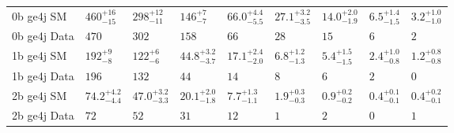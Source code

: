\begin{center}
\begin{table}[h!]
\begin{tabular}{ lllllllll }
\hline
0b ge4j SM \T   & $460^{+16}_{-15}$              & $298^{+12}_{-11}$              & $146^{+7}_{-7}$                & $66.0^{+4.4}_{-5.5}$           & $27.1^{+3.2}_{-3.5}$           & $14.0^{+2.0}_{-1.9}$           & $6.5^{+1.4}_{-1.5}$            & $3.2^{+1.0}_{-1.0}$            \\ 
0b ge4j Data \T & $470$                          & $302$                          & $158$                          & $66$                           & $28$                           & $15$                           & $6$                            & $2$                            \\ 
\hline
1b ge4j SM \T   & $192^{+9}_{-8}$                & $122^{+6}_{-6}$                & $44.8^{+3.2}_{-3.7}$           & $17.1^{+2.4}_{-2.0}$           & $6.8^{+1.2}_{-1.3}$            & $5.4^{+1.5}_{-1.5}$            & $2.4^{+1.0}_{-0.8}$            & $1.2^{+0.8}_{-0.8}$            \\ 
1b ge4j Data \T & $196$                          & $132$                          & $44$                           & $14$                           & $8$                            & $6$                            & $2$                            & $0$                            \\ 
\hline
2b ge4j SM \T   & $74.2^{+4.2}_{-4.4}$           & $47.0^{+3.2}_{-3.3}$           & $20.1^{+2.0}_{-1.8}$           & $7.7^{+1.3}_{-1.1}$            & $1.9^{+0.3}_{-0.3}$            & $0.9^{+0.2}_{-0.2}$            & $0.4^{+0.1}_{-0.1}$            & $0.4^{+0.2}_{-0.1}$            \\ 
2b ge4j Data\T & $72$                           & $52$                           & $31$                           & $12$                           & $1$                            & $2$                            & $0$                            & $1$                            \\ 
\hline
  \end{tabular}
\end{table}
\end{center}

